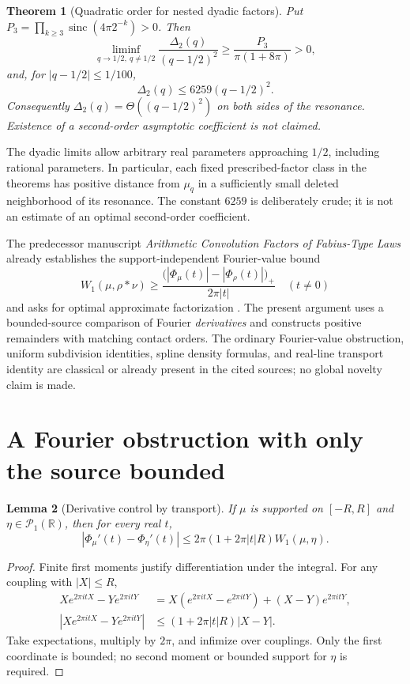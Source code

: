 \documentclass[11pt,letterpaper]{article}
\newtheorem{theorem}{Theorem}[section]
\newtheorem{lemma}[theorem]{Lemma}
\theoremstyle{remark}\newtheorem{remark}[theorem]{Remark}
\newcommand{\R}{\mathbb R}\newcommand{\E}{\mathbb E}
\newcommand{\Pone}{\mathcal P_1(\R)}
\newcommand{\sinc}{\operatorname{sinc}}
\begin{document}
\begin{theorem}[Quadratic order for nested dyadic factors]\label{thm:quadratic}
Put $P_3=\prod_{k\ge3}\sinc(4\pi2^{-k})>0$. Then
\[
\liminf_{q\to1/2,\ q\ne1/2}\frac{\Delta_2(q)}{(q-1/2)^2}
\ge\frac{P_3}{\pi(1+8\pi)}>0,
\]
and, for $|q-1/2|\le1/100$,
\[
\Delta_2(q)\le6259(q-1/2)^2.
\]
Consequently $\Delta_2(q)=\Theta((q-1/2)^2)$ on both sides of the resonance. Existence of a second-order asymptotic coefficient is not claimed.
\end{theorem}

The dyadic limits allow arbitrary real parameters approaching $1/2$, including rational parameters. In particular, each fixed prescribed-factor class in the theorems has positive distance from $\mu_q$ in a sufficiently small deleted neighborhood of its resonance. The constant $6259$ is deliberately crude; it is not an estimate of an optimal second-order coefficient.

The predecessor manuscript \emph{Arithmetic Convolution Factors of Fabius-Type Laws} already establishes the support-independent Fourier-value bound
\[
W_1(\mu,\rho*\nu)\ge
\frac{\bigl(|\Phi_\mu(t)|-|\Phi_\rho(t)|\bigr)_+}{2\pi|t|}
\quad(t\ne0)
\]
and asks for optimal approximate factorization \cite[Proposition \texttt{prop:wasserstein} and the corresponding research question]{Predecessor}. The present argument uses a bounded-source comparison of Fourier \emph{derivatives} and constructs positive remainders with matching contact orders. The ordinary Fourier-value obstruction, uniform subdivision identities, spline density formulas, and real-line transport identity are classical or already present in the cited sources; no global novelty claim is made.

\section{A Fourier obstruction with only the source bounded}\label{sec:fourier}

\begin{lemma}[Derivative control by transport]\label{lem:derivative}
If $\mu$ is supported on $[-R,R]$ and $\eta\in\Pone$, then for every real $t$,
\[
|\Phi_\mu'(t)-\Phi_\eta'(t)|
\le2\pi(1+2\pi|t|R)W_1(\mu,\eta).
\]
\end{lemma}
\begin{proof}
Finite first moments justify differentiation under the integral. For any coupling with $|X|\le R$,
\begin{align*}
Xe^{2\pi itX}-Ye^{2\pi itY}
&=X(e^{2\pi itX}-e^{2\pi itY})+(X-Y)e^{2\pi itY},\\
|Xe^{2\pi itX}-Ye^{2\pi itY}|
&\le(1+2\pi|t|R)|X-Y|.
\end{align*}
Take expectations, multiply by $2\pi$, and infimize over couplings. Only the first coordinate is bounded; no second moment or bounded support for $\eta$ is required.
\end{proof}
\end{document}
